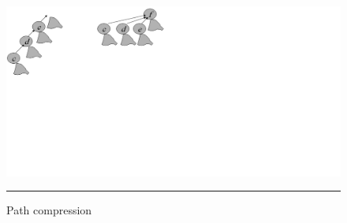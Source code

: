 \begin{figure}[htbp]
	\centering
		\includegraphics{./Figures/Mitosis_5.png}
		\rule{25em}{0.3pt}
	\caption[Path compression]{Path compression}
	\label{fig:mitosis_5}
\end{figure}

